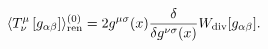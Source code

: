 \begin{equation}
\langle T_{\nu }^{\mu }\left[ g_{\alpha \beta }\right] \rangle _{{\rm ren}%
}^{(0)}=2g^{\mu \sigma }(x)\frac{\delta }{\delta g^{\nu \sigma }(x)}W_{{\rm %
div}}[g_{\alpha \beta }].  \label{gravemt}
\end{equation}

